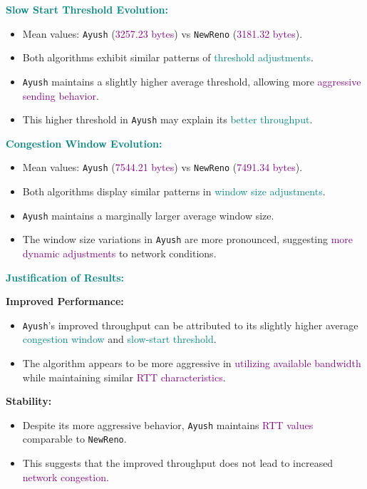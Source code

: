 \documentclass[11pt,a4paper]{article}
\begin{document}
\textbf{\textcolor{teal}{Slow Start Threshold Evolution:}}

\begin{itemize}
    \item Mean values: \texttt{Ayush} (\textcolor{purple}{3257.23 bytes}) vs \texttt{NewReno} (\textcolor{purple}{3181.32 bytes}).
    \item Both algorithms exhibit similar patterns of \textcolor{teal}{threshold adjustments}.
    \item \texttt{Ayush} maintains a slightly higher average threshold, allowing more \textcolor{purple}{aggressive sending behavior}.
    \item This higher threshold in \texttt{Ayush} may explain its \textcolor{teal}{better throughput}.
\end{itemize}

\textbf{\textcolor{teal}{Congestion Window Evolution:}}

\begin{itemize}
    \item Mean values: \texttt{Ayush} (\textcolor{purple}{7544.21 bytes}) vs \texttt{NewReno} (\textcolor{purple}{7491.34 bytes}).
    \item Both algorithms display similar patterns in \textcolor{teal}{window size adjustments}.
    \item \texttt{Ayush} maintains a marginally larger average window size.
    \item The window size variations in \texttt{Ayush} are more pronounced, suggesting \textcolor{purple}{more dynamic adjustments} to network conditions.
\end{itemize}

\textbf{\textcolor{teal}{Justification of Results:}}

\textbf{Improved Performance:}
\begin{itemize}
    \item \texttt{Ayush}'s improved throughput can be attributed to its slightly higher average \textcolor{teal}{congestion window} and \textcolor{teal}{slow-start threshold}.
    \item The algorithm appears to be more aggressive in \textcolor{purple}{utilizing available bandwidth} while maintaining similar \textcolor{purple}{RTT characteristics}.
\end{itemize}

\textbf{Stability:}
\begin{itemize}
    \item Despite its more aggressive behavior, \texttt{Ayush} maintains \textcolor{purple}{RTT values} comparable to \texttt{NewReno}.
    \item This suggests that the improved throughput does not lead to increased \textcolor{purple}{network congestion}.
\end{itemize}
\end{document}
